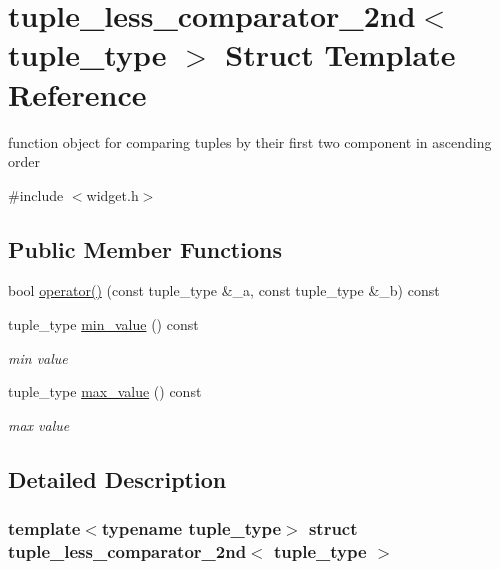 \hypertarget{structtuple__less__comparator__2nd}{}\section{tuple\+\_\+less\+\_\+comparator\+\_\+2nd$<$ tuple\+\_\+type $>$ Struct Template Reference}
\label{structtuple__less__comparator__2nd}


function object for comparing tuples by their first two component in ascending order  




{\ttfamily \#include $<$widget.\+h$>$}

\subsection*{Public Member Functions}
\begin{DoxyCompactItemize}
\item 
bool \hyperlink{structtuple__less__comparator__2nd_a323236eaaac70cda8e4c7ccbfde17fc2}{operator()} (const tuple\+\_\+type \&\+\_\+a, const tuple\+\_\+type \&\+\_\+b) const
\item 
tuple\+\_\+type \hyperlink{structtuple__less__comparator__2nd_a9b508a5f80bfb71efd337db16683ec7a}{min\+\_\+value} () const
\begin{DoxyCompactList}\small\item\em min value \end{DoxyCompactList}\item 
tuple\+\_\+type \hyperlink{structtuple__less__comparator__2nd_aaf46814db637befeda6a9225723a59f6}{max\+\_\+value} () const
\begin{DoxyCompactList}\small\item\em max value \end{DoxyCompactList}\end{DoxyCompactItemize}


\subsection{Detailed Description}
\subsubsection*{template$<$typename tuple\+\_\+type$>$\newline
struct tuple\+\_\+less\+\_\+comparator\+\_\+2nd$<$ tuple\+\_\+type $>$}

